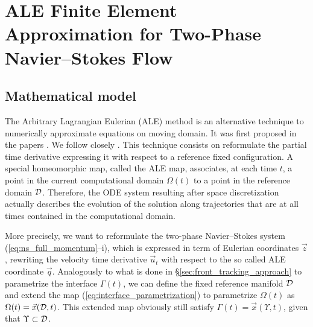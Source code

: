 \chapter[Two-Phase Navier--Stokes Flow ALE FEM]
{\sc ALE Finite Element Approximation for Two-Phase Navier--Stokes Flow}
\label{ch:ale}

\section{Mathematical model}\label{sec:ale_model}
The Arbitrary Lagrangian Eulerian (ALE) method is an alternative technique to
numerically approximate equations on moving domain. It was first proposed in
the papers \cite{Donea83,Hughes81}. We follow
closely \cite{Nobile99,Formaggia04,NobilePhd}. This technique consists on
reformulate the partial time derivative expressing it with respect to a
reference fixed configuration. A special homeomorphic map, called the ALE map,
associates, at each time $t$, a point in the current computational domain
$\Omega(t)$ to a point in the reference domain $\mathcal D$. Therefore, the ODE system
resulting after space discretization actually describes the evolution of the
solution along trajectories that are at all times contained in the computational
domain.

More precisely, we want to reformulate the two-phase Navier--Stokes system
(\ref{eq:ns_full_momentum}--i), which is expressed in term of Eulerian
coordinates $\vec z$, rewriting the velocity time derivative $\vec u_t$ with
respect to the so called ALE coordinate $\vec q$. Analogously to what is done
in \S\ref{sec:front_tracking_approach} to parametrize the interface
$\Gamma(t)$, we can define the fixed reference manifold $\mathcal D$ and extend the map
(\ref{eq:interface_parametrization}) to parametrize $\Omega(t)$ as
$\Omega(t)=\vec x(\mathcal D,t)$. This extended map obviously still satisfy $\Gamma(t)
= \vec x(\Upsilon,t)$, given that $\Upsilon\subset\mathcal D$.

